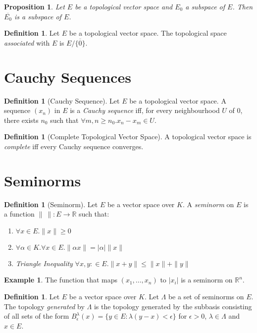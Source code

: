\documentclass{book}
\newtheorem{prop}[ax]{Proposition}
\theoremstyle{definition}
\newtheorem{df}[ax]{Definition}
\newtheorem{ex}[ax]{Example}
\begin{document}
\begin{prop}
Let $E$ be a topological vector space and $E_0$ a subspace of $E$. Then $\overline{E_0}$ is a subspace of $E$.
\end{prop}

\begin{df}
Let $E$ be a topological vector space. The topological space \emph{associated} with $E$ is $E / \overline{\{0\}}$.
\end{df}

\section{Cauchy Sequences}

\begin{df}[Cauchy Sequence]
Let $E$ be a topological vector space. A sequence $(x_n)$ in $E$ is a \emph{Cauchy sequence} iff, for every neighbourhood $U$ of 0, there exists $n_0$ such that $\forall m,n \geq n_0. x_n - x_m \in U$.
\end{df}

\begin{df}[Complete Topological Vector Space]
A topological vector space is \emph{complete} iff every Cauchy sequence converges.
\end{df}

\section{Seminorms}

\begin{df}[Seminorm]
Let $E$ be a vector space over $K$. A \emph{seminorm} on $E$ is a function $\|\ \| : E \rightarrow \mathbb{R}$ such that:
\begin{enumerate}
\item $\forall x \in E. \| x \| \geq 0$
\item $\forall \alpha \in K. \forall x \in E. \| \alpha x \| = |\alpha| \|x\|$
\item \emph{Triangle Inequality} $\forall x,y : \in E. \| x + y \| \leq \| x \| + \| y \|$
\end{enumerate}
\end{df}

\begin{ex}
The function that maps $(x_1, \ldots, x_n)$ to $|x_i|$ is a seminorm on $\mathbb{R}^n$.
\end{ex}

\begin{df}
Let $E$ be a vector space over $K$.
Let $\Lambda$ be a set of seminorms on $E$. The topology \emph{generated} by $\Lambda$ is the topology generated by the subbasis consisting of all sets of the form $B_\epsilon^\lambda(x) = \{ y \in E : \lambda(y-x) < \epsilon \}$ for $\epsilon > 0$, $\lambda \in \Lambda$ and $x \in E$.
\end{df}
\end{document}
